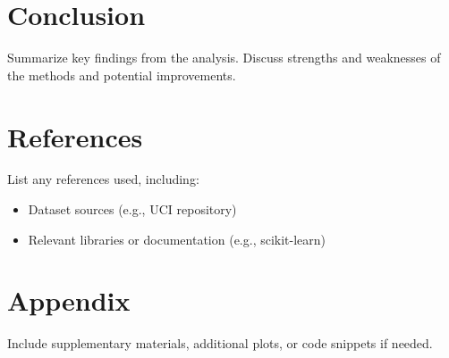 \documentclass[12pt]{article}
\begin{document}
\section{Conclusion}
Summarize key findings from the analysis. Discuss strengths and weaknesses of the methods and potential improvements.

\section{References}
List any references used, including:
\begin{itemize}
    \item Dataset sources (e.g., UCI repository)
    \item Relevant libraries or documentation (e.g., scikit-learn)
\end{itemize}

\appendix
\section{Appendix}
Include supplementary materials, additional plots, or code snippets if needed.
\end{document}
